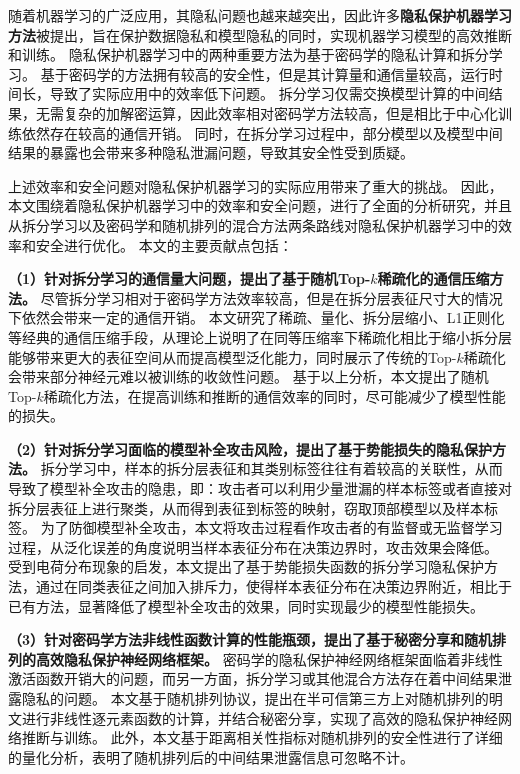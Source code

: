 \cleardoublepage
{}
随着机器学习的广泛应用，其隐私问题也越来越突出，因此许多\textbf{隐私保护机器学习方法}被提出，旨在保护数据隐私和模型隐私的同时，实现机器学习模型的高效推断和训练。
%
隐私保护机器学习中的两种重要方法为基于密码学的隐私计算和拆分学习。
基于密码学的方法拥有较高的安全性，但是其计算量和通信量较高，运行时间长，导致了实际应用中的效率低下问题。
拆分学习仅需交换模型计算的中间结果，无需复杂的加解密运算，因此效率相对密码学方法较高，但是相比于中心化训练依然存在较高的通信开销。
同时，在拆分学习过程中，部分模型以及模型中间结果的暴露也会带来多种隐私泄漏问题，导致其安全性受到质疑。
%

上述效率和安全问题对隐私保护机器学习的实际应用带来了重大的挑战。
%
因此，本文围绕着隐私保护机器学习中的效率和安全问题，进行了全面的分析研究，并且从拆分学习以及密码学和随机排列的混合方法两条路线对隐私保护机器学习中的效率和安全进行优化。
%
本文的主要贡献点包括：


\textbf{（1）针对拆分学习的通信量大问题，提出了基于随机Top-$k$稀疏化的通信压缩方法。}
尽管拆分学习相对于密码学方法效率较高，但是在拆分层表征尺寸大的情况下依然会带来一定的通信开销。
%
本文研究了稀疏、量化、拆分层缩小、L1正则化等经典的通信压缩手段，从理论上说明了在同等压缩率下稀疏化相比于缩小拆分层能够带来更大的表征空间从而提高模型泛化能力，同时展示了传统的Top-$k$稀疏化会带来部分神经元难以被训练的收敛性问题。
%
基于以上分析，本文提出了随机Top-$k$稀疏化方法，在提高训练和推断的通信效率的同时，尽可能减少了模型性能的损失。

\textbf{（2）针对拆分学习面临的模型补全攻击风险，提出了基于势能损失的隐私保护方法。}
拆分学习中，样本的拆分层表征和其类别标签往往有着较高的关联性，从而导致了模型补全攻击的隐患，即：攻击者可以利用少量泄漏的样本标签或者直接对拆分层表征上进行聚类，从而得到表征到标签的映射，窃取顶部模型以及样本标签。
%
为了防御模型补全攻击，本文将攻击过程看作攻击者的有监督或无监督学习过程，从泛化误差的角度说明当样本表征分布在决策边界时，攻击效果会降低。
%
受到电荷分布现象的启发，本文提出了基于势能损失函数的拆分学习隐私保护方法，通过在同类表征之间加入排斥力，使得样本表征分布在决策边界附近，相比于已有方法，显著降低了模型补全攻击的效果，同时实现最少的模型性能损失。
%

\textbf{（3）针对密码学方法非线性函数计算的性能瓶颈，提出了基于秘密分享和随机排列的高效隐私保护神经网络框架。}
密码学的隐私保护神经网络框架面临着非线性激活函数开销大的问题，而另一方面，拆分学习或其他混合方法存在着中间结果泄露隐私的问题。
%
本文基于随机排列协议，提出在半可信第三方上对随机排列的明文进行非线性逐元素函数的计算，并结合秘密分享，实现了高效的隐私保护神经网络推断与训练。%
%
此外，本文基于距离相关性指标对随机排列的安全性进行了详细的量化分析，表明了随机排列后的中间结果泄露信息可忽略不计。


